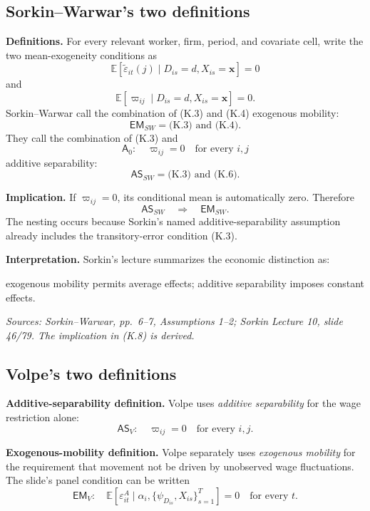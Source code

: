 \documentclass[11pt]{article}
\begin{document}
\subsection{Sorkin--Warwar's two definitions}

\textbf{Definitions.}
For every relevant worker, firm, period, and covariate cell, write the two
mean-exogeneity conditions as
\[
\mathbb E[
\widetilde\varepsilon_{it}(j)
\mid D_{is}=d,X_{is}=\mathbf x]
=0
\tag{K.3}
\]
and
\[
\mathbb E[
\varpi_{ij}
\mid D_{is}=d,X_{is}=\mathbf x]
=0.
\tag{K.4}
\]
Sorkin--Warwar call the combination of (K.3) and (K.4) exogenous mobility:
\[
\mathsf{EM}_{SW}
=
\text{(K.3) and (K.4)}.
\tag{K.5}
\]
They call the combination of (K.3) and
\[
\mathsf A_0:
\quad
\varpi_{ij}=0
\quad\text{for every }i,j
\tag{K.6}
\]
additive separability:
\[
\mathsf{AS}_{SW}
=
\text{(K.3) and (K.6)}.
\tag{K.7}
\]

\textbf{Implication.}
If \(\varpi_{ij}=0\), its conditional mean is automatically zero.  Therefore
\[
\mathsf{AS}_{SW}
\quad\Longrightarrow\quad
\mathsf{EM}_{SW}.
\tag{K.8}
\]
The nesting occurs because Sorkin's named additive-separability assumption
already includes the transitory-error condition (K.3).

\textbf{Interpretation.}
Sorkin's lecture summarizes the economic distinction as:

\begin{center}
exogenous mobility permits average effects; additive separability imposes
constant effects.
\end{center}

\textit{Sources: Sorkin--Warwar, pp.\ 6--7, Assumptions 1--2; Sorkin
Lecture 10, slide 46/79.  The implication in (K.8) is derived.}

\subsection{Volpe's two definitions}

\textbf{Additive-separability definition.}
Volpe uses \emph{additive separability} for the wage restriction alone:
\[
\mathsf{AS}_{V}:
\quad
\varpi_{ij}=0
\quad\text{for every }i,j.
\tag{K.9}
\]

\textbf{Exogenous-mobility definition.}
Volpe separately uses \emph{exogenous mobility} for the requirement that
movement not be driven by unobserved wage fluctuations.  The slide's panel
condition can be written
\[
\mathsf{EM}_{V}:
\quad
\mathbb E\left[
\varepsilon^A_{it}
\mid
\alpha_i,\{\psi_{D_{is}},X_{is}\}_{s=1}^{T}
\right]
=0
\quad\text{for every }t.
\tag{K.10}
\]
\end{document}
